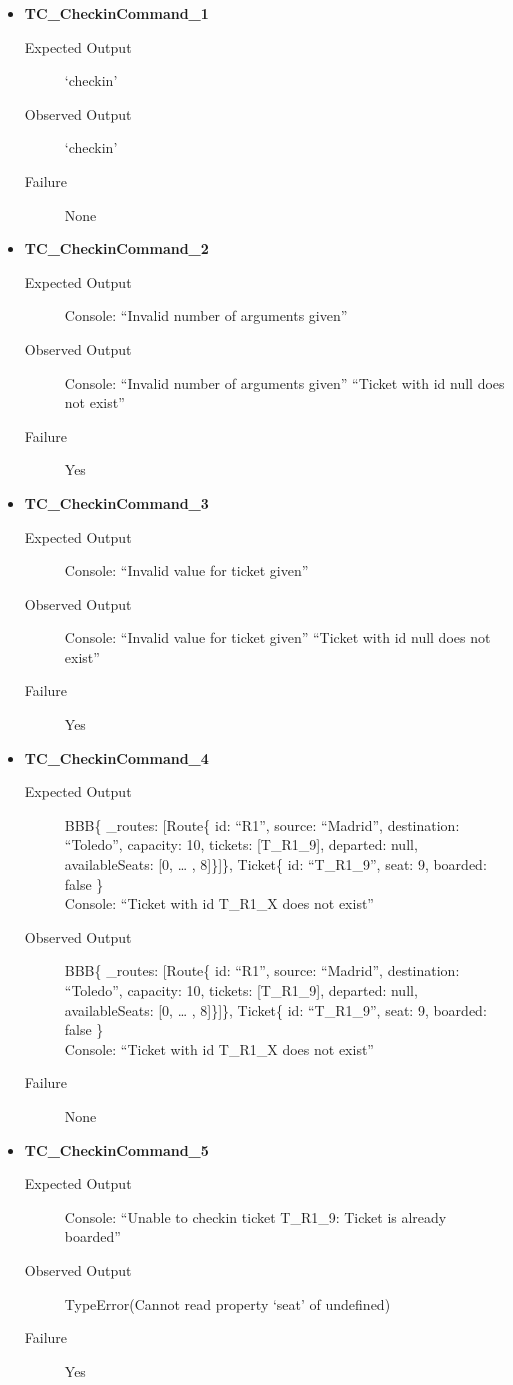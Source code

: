 \documentclass[11pt]{article}
\begin{document}
\begin{itemize}
\item \textbf{TC\_CheckinCommand\_1}
\begin{description}
\item[{Expected Output}] ‘checkin’
\item[{Observed Output}] ‘checkin’
\item[{Failure}] None
\end{description}

\item \textbf{TC\_CheckinCommand\_2}
\begin{description}
\item[{Expected Output}] Console: “Invalid number of arguments given”
\item[{Observed Output}] Console: “Invalid number of arguments given”
“Ticket with id null does not exist”
\item[{Failure}] Yes
\end{description}

\item \textbf{TC\_CheckinCommand\_3}
\begin{description}
\item[{Expected Output}] Console: “Invalid value for ticket given”
\item[{Observed Output}] Console: “Invalid value for ticket given”
“Ticket with id null does not exist”
\item[{Failure}] Yes
\end{description}

\item \textbf{TC\_CheckinCommand\_4}
\begin{description}
\item[{Expected Output}] BBB\{ \_routes: [Route\{ id: “R1”, source: “Madrid”, destination: “Toledo”, capacity: 10,  tickets: [T\_R1\_9], departed: null, availableSeats: [0, … , 8]\}]\}, Ticket\{ id: “T\_R1\_9”, seat: 9, boarded: false \}\\
Console: “Ticket with id T\_R1\_X does not exist”
\item[{Observed Output}] BBB\{ \_routes: [Route\{ id: “R1”, source: “Madrid”, destination: “Toledo”, capacity: 10,  tickets: [T\_R1\_9], departed: null, availableSeats: [0, … , 8]\}]\}, Ticket\{ id: “T\_R1\_9”, seat: 9, boarded: false \}\\
Console: “Ticket with id T\_R1\_X does not exist”
\item[{Failure}] None
\end{description}

\item \textbf{TC\_CheckinCommand\_5}
\begin{description}
\item[{Expected Output}] Console: “Unable to checkin ticket T\_R1\_9: Ticket is already boarded”
\item[{Observed Output}] TypeError(Cannot read property ‘seat’ of undefined)
\item[{Failure}] Yes
\end{description}


\end{itemize}
\end{document}

